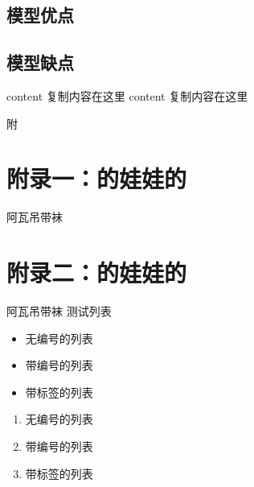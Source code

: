 \documentclass{MathorCupmodeling}
\begin{document}
	\subsection{模型优点}
	\subsection{模型缺点}
	


	\newpage


	\begin{thebibliography}{99}
	content
	复制内容在这里
	content
	复制内容在这里
	\end{thebibliography}

	\newpage
	\appendix
	\begin{center}
		\heiti{} 附\hspace{1pc}

	\end{center}
	\section{附录一：的娃娃的}
	阿瓦吊带袜
	\section{附录二：的娃娃的}
	阿瓦吊带袜
	测试列表
\begin{itemize}
\item 无编号的列表
\item 带编号的列表
\item 带标签的列表
\end{itemize}

\begin{enumerate}
\item 无编号的列表
\item 带编号的列表
\item 带标签的列表
\end{enumerate}
\end{document}
